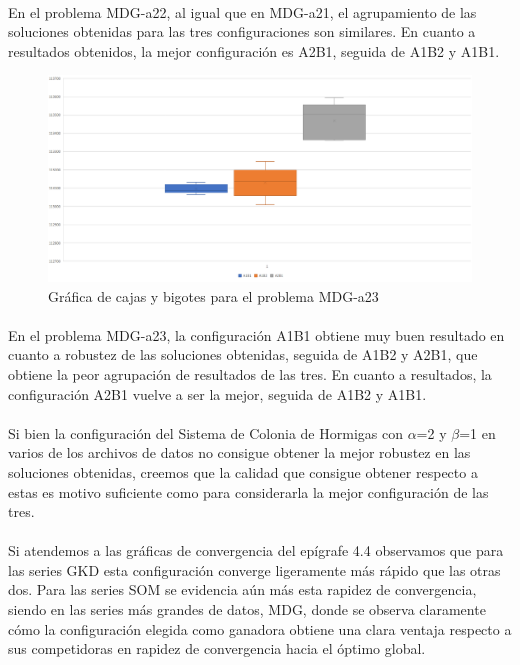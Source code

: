 	\paragraph{}En el problema MDG-a22, al igual que en MDG-a21, el agrupamiento de las soluciones obtenidas para las tres configuraciones son similares. En cuanto a resultados obtenidos, la mejor configuración es A2B1, seguida de A1B2 y A1B1.

	\begin{figure}[H]
		\centering
		\includegraphics[scale=0.3]{img/BIGOTESMDG3.png}
		\caption{Gráfica de cajas y bigotes para el problema MDG-a23}
		\label{MDG-a23_bigotes}
	\end{figure}

	\paragraph{}En el problema MDG-a23, la configuración A1B1 obtiene muy buen resultado en cuanto a robustez de las soluciones obtenidas, seguida de A1B2 y A2B1, que obtiene la peor agrupación de resultados de las tres. En cuanto a resultados, la configuración A2B1 vuelve a ser la mejor, seguida de A1B2 y A1B1.
	
	\paragraph{}Si bien la configuración del Sistema de Colonia de Hormigas con $\alpha$=2 y $\beta$=1 en varios de los archivos de datos no consigue obtener la mejor robustez en las soluciones obtenidas, creemos que la calidad que consigue obtener respecto a estas es motivo suficiente como para considerarla la mejor configuración de las tres.
	
	\paragraph{}Si atendemos a las gráficas de convergencia del epígrafe 4.4 observamos que para las series GKD esta configuración converge ligeramente más rápido que las otras dos. Para las series SOM se evidencia aún más esta rapidez de convergencia, siendo en las series más grandes de datos, MDG, donde se observa claramente cómo la configuración elegida como ganadora obtiene una clara ventaja respecto a sus competidoras en rapidez de convergencia hacia el óptimo global.
	
